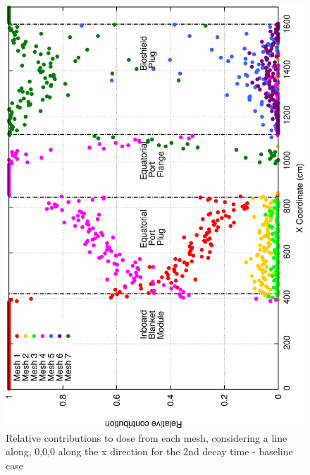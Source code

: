 \documentclass[12pt]{article}
\begin{document}
\begin{figure}[ht!]
\centering
\includegraphics[clip,scale=0.25]{../plots/crosstalk/nob4c/ep/dc2_rel.png}
\caption{Relative contributions to dose from each mesh, considering a line along, 
         0,0,0 along the x direction for the 2nd decay time - baseline case}
\label{fig:ct_ep_dc2_rel}
\end{figure}
\end{document}
